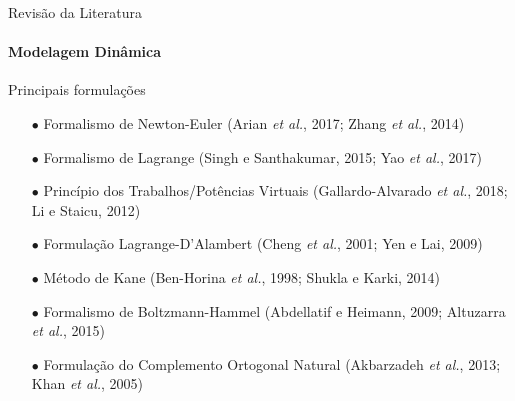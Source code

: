 \documentclass[25pt,landscape]{beamer}
\begin{document}
\begin{frame}{Revisão da Literatura}
    \framesubtitle{Modelagem Dinâmica}
    \begin{block}{Principais formulações}
        \begin{itemize}
            \item[$\bullet$] Formalismo de Newton-Euler (Arian \emph{et al.}, 2017; Zhang \emph{et al.}, 2014) \\[4pt] %
            \item[$\bullet$] Formalismo de Lagrange (Singh e Santhakumar, 2015; Yao \emph{et al.}, 2017) \\[4pt] %
            \item[$\bullet$] Princípio dos Trabalhos/Potências Virtuais (Gallardo-Alvarado \emph{et al.}, 2018; Li e Staicu, 2012) \\[4pt] %
            \item[$\bullet$] Formulação Lagrange-D'Alambert (Cheng \emph{et al.}, 2001; Yen e Lai, 2009) \\[4pt]
            \item[$\bullet$] Método de Kane (Ben-Horina \emph{et al.}, 1998; Shukla e Karki, 2014) \\[4pt]
            \item[$\bullet$] Formalismo de Boltzmann-Hammel (Abdellatif e Heimann, 2009; Altuzarra \emph{et al.}, 2015) \\[4pt]
            \item[$\bullet$] Formulação do Complemento Ortogonal Natural  (Akbarzadeh \emph{et al.}, 2013; Khan \emph{et al.}, 2005) \\[4pt] %
        \end{itemize}
    \end{block}
\end{frame}
\end{document}

